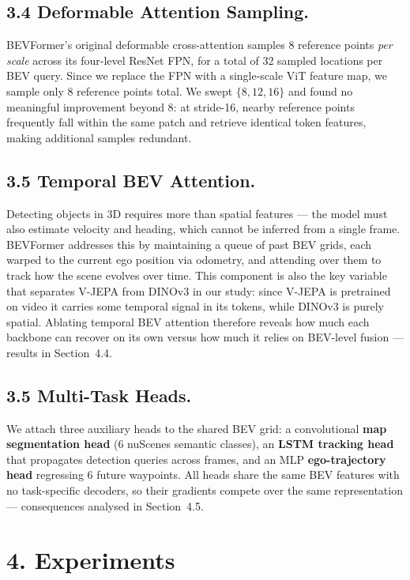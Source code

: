 \documentclass[12pt]{article}
\begin{document}
\subsection{3.4 Deformable Attention Sampling.}
 
BEVFormer's original deformable cross-attention samples 8 reference points
\textit{per scale} across its four-level ResNet FPN, for a total of 32 sampled
locations per BEV query. Since we replace the FPN with a single-scale ViT
feature map, we sample only 8 reference points total. We swept $\{8, 12, 16\}$
and found no meaningful improvement beyond 8: at stride-16, nearby reference
points frequently fall within the same patch and retrieve identical token
features, making additional samples redundant.


\subsection{3.5 Temporal BEV Attention.}
 Detecting objects in 3D requires more than spatial features --- the model must
also estimate velocity and heading, which cannot be inferred from a single
frame. BEVFormer addresses this by maintaining a queue of past BEV grids,
each warped to the current ego position via odometry, and attending over them
to track how the scene evolves over time.
This component is also the key variable that separates V-JEPA from DINOv3 in
our study: since V-JEPA is pretrained on video it carries some temporal signal
in its tokens, while DINOv3 is purely spatial. Ablating temporal BEV attention
therefore reveals how much each backbone can recover on its own versus how
much it relies on BEV-level fusion --- results in Section~4.4.
 \subsection{3.5 Multi-Task Heads.}
We attach three auxiliary heads to the shared BEV grid: a convolutional
\textbf{map segmentation head} (6 nuScenes semantic classes), an
\textbf{LSTM tracking head} that propagates detection queries across frames,
and an MLP \textbf{ego-trajectory head} regressing 6 future waypoints.
All heads share the same BEV features with no task-specific decoders,
so their gradients compete over the same representation --- consequences
analysed in Section~4.5.

\section{4. Experiments}
\end{document}
